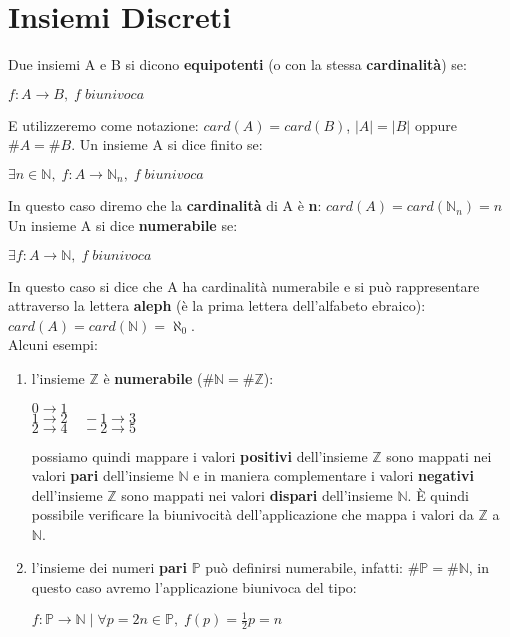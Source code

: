 \section{Insiemi Discreti}
Due insiemi A e B si dicono \textbf{equipotenti} (o con la stessa \textbf{cardinalità}) se:
\begin{center}
    $f : A \rightarrow B, \; f \; biunivoca$
\end{center}
E utilizzeremo come notazione: $card(A) = card(B)$, $|A| = |B|$ oppure $\#A = \#B$.
Un insieme A si dice finito se:
\begin{center}
    $\exists n \in \mathbb{N}, \; f : A \rightarrow \mathbb{N}_n, \; f \; biunivoca$
\end{center}
In questo caso diremo che la \textbf{cardinalità} di A è \textbf{n}: $card(A) = card(\mathbb{N}_n) = n$ \\
Un insieme A si dice \textbf{numerabile} se:
\begin{center}
    $\exists f : A \rightarrow \mathbb{N}, \; f \; biunivoca$
\end{center}
In questo caso si dice che A ha cardinalità numerabile e si può rappresentare attraverso la lettera \textbf{aleph} (è la prima lettera dell'alfabeto ebraico): $card(A) = card(\mathbb{N}) = \aleph_0$. \\
Alcuni esempi: 
\begin{enumerate}
    \item l'insieme $\mathbb{Z}$ è \textbf{numerabile} ($\#\mathbb{N} = \#\mathbb{Z}$):
        \begin{center}
            $0 \rightarrow 1$ \\
            $1 \rightarrow 2 \;\;\;\; -1 \rightarrow 3$ \\
            $2 \rightarrow 4 \;\;\;\; -2 \rightarrow 5$
        \end{center}
    possiamo quindi mappare i valori \textbf{positivi} dell'insieme $\mathbb{Z}$ sono mappati nei valori \textbf{pari} dell'insieme $\mathbb{N}$ e in maniera complementare i valori \textbf{negativi} dell'insieme $\mathbb{Z}$ sono mappati nei valori \textbf{dispari} dell'insieme $\mathbb{N}$. È quindi possibile verificare la biunivocità dell'applicazione che mappa i valori da $\mathbb{Z}$ a $\mathbb{N}$.
    \item l'insieme dei numeri \textbf{pari} $\mathbb{P}$ può definirsi numerabile, infatti: $\#\mathbb{P} = \#\mathbb{N}$, in questo caso avremo l'applicazione biunivoca del tipo:
        \begin{center}
            $f : \mathbb{P} \rightarrow \mathbb{N} \; | \; \forall p = 2n \in \mathbb{P}, \; f(p) = \frac{1}{2}p = n$
        \end{center}
\end{enumerate}


